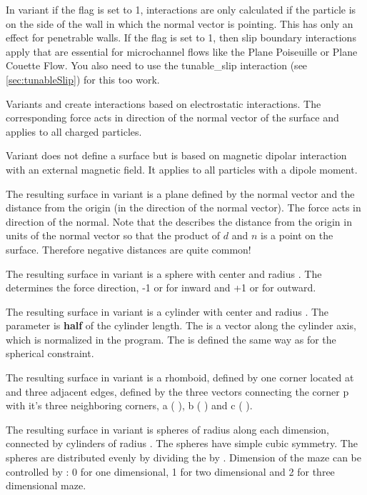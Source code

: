 In variant  if the  flag is set to
1, interactions are only calculated if the particle is on the side of
the wall in which the normal vector is pointing. This has only an
effect for penetrable walls. If the  flag is set
to 1, then slip boundary interactions apply that are essential for
microchannel flows like the Plane Poiseuille or Plane Couette
Flow. You also need to use the tunable_slip interaction (see
\ref{sec:tunableSlip}) for this too work.

Variants  and  create interactions based on electrostatic
interactions. The corresponding force acts in direction of the normal vector of the
surface and applies to all charged particles.

Variant  does not define a surface but is based on magnetic
dipolar interaction with an external magnetic field. It applies to all particles
with a dipole moment.

The resulting surface in variant  is a plane defined by the
normal vector    and the distance
 from the origin (in the direction of the normal vector). The force acts in direction of the normal. 
Note that the  describes the distance from the origin in units
of the normal vector so that the product of $d$ and $n$ is a point on the
surface. Therefore negative distances are quite common!

The resulting surface in variant
 is a sphere with center    and radius
. The  determines the force direction, -1 or
 for inward and +1 or  for outward. 

The resulting surface
in variant  is a cylinder with center  
 and radius . The  parameter is \textbf{half} 
of the cylinder length. The  is a
vector along the cylinder axis, which is normalized in the program.
The  is defined the same way as for the spherical
constraint. 

The resulting surface in variant  is a rhomboid, defined by one 
corner located at    and three adjacent edges, 
defined by the three vectors connecting the corner p with it's three neighboring
corners, a (  ), b (  ) 
and c (  ).

The resulting surface in variant  is 
spheres of radius  along each dimension, connected by
cylinders of radius . The spheres have simple cubic
symmetry. The spheres are distributed evenly by dividing the
 by .  Dimension of the maze can be controlled by
: 0 for one dimensional, 1 for two dimensional and 2 for three
dimensional maze.

